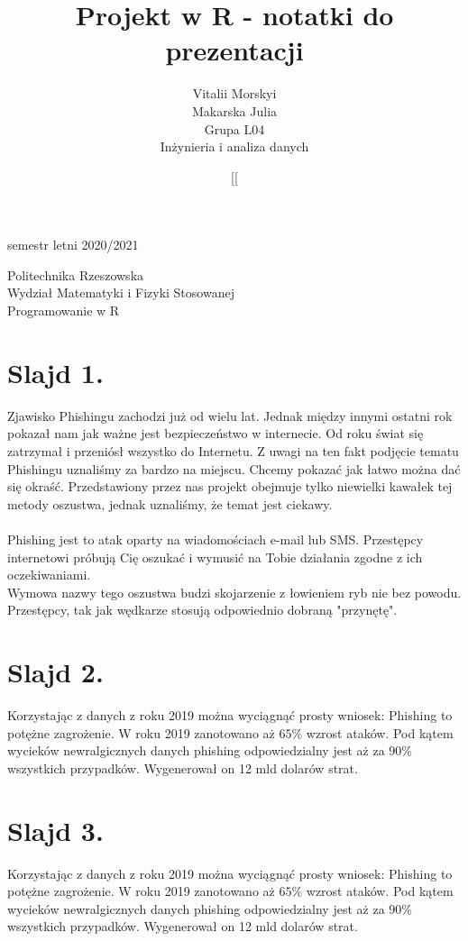 \documentclass{article}
\date[semestr letni 2020/2021
\author{Vitalii Morskyi\\Makarska Julia\\Grupa L04\\Inżynieria i analiza danych}
\title{Projekt w R - notatki do prezentacji}
\makeatletter
\renewcommand{\maketitle}{\begin{titlepage}
		\vspace{0.5cm}
		\vspace{\stretch{6}}
		\begin{flushright}
			\date[semestr letni 2020/2021
		\end{flushright}	
		\vspace*{2cm}
		\begin{center}
			Politechnika Rzeszowska\\
			Wydział Matematyki i Fizyki Stosowanej\\
			Programowanie w R
		\end{center}
		\vspace{3cm}
		\noindent
		\begin{center}
			\Large \@title
		\end{center}
		\vspace{13cm}
		\begin{flushright}
			\begin{minipage}{6.5cm}
				\begin{flushright}
					\normalsize \@author \par
				\end{flushright}
			\end{minipage}
		\end{flushright}
	\end{titlepage}
}
\makeatother
\begin{document}
	\maketitle	
	\tableofcontents %
	\newpage
	
\section{Slajd 1.}
{
	Zjawisko Phishingu zachodzi już od wielu lat. Jednak między innymi ostatni rok pokazał nam jak ważne jest bezpieczeństwo w internecie. Od roku świat się zatrzymał i przeniósł wszystko do Internetu. Z uwagi na ten fakt podjęcie tematu Phishingu uznaliśmy za bardzo na miejscu. Chcemy pokazać jak łatwo można dać się okraść. Przedstawiony przez nas projekt obejmuje tylko niewielki kawałek tej metody oszustwa, jednak uznaliśmy, że temat jest ciekawy.\\
	~\\
	Phishing jest to atak oparty na wiadomościach e-mail lub SMS. Przestępcy internetowi próbują Cię oszukać i wymusić na Tobie działania zgodne z ich oczekiwaniami.\\
	Wymowa nazwy tego oszustwa budzi skojarzenie z łowieniem ryb nie bez powodu. Przestępcy, tak jak wędkarze stosują odpowiednio dobraną "przynętę".
}
\section{Slajd 2.}
{
	Korzystając z danych z roku 2019 można wyciągnąć prosty wniosek: Phishing to potężne zagrożenie. W roku 2019 zanotowano aż $65\%$ wzrost ataków. Pod kątem wycieków newralgicznych danych phishing odpowiedzialny jest aż za $90\%$ wszystkich przypadków. Wygenerował on 12 mld dolarów strat.
}
\section{Slajd 3.}
{
	Korzystając z danych z roku 2019 można wyciągnąć prosty wniosek: Phishing to potężne zagrożenie. W roku 2019 zanotowano aż $65\%$ wzrost ataków. Pod kątem wycieków newralgicznych danych phishing odpowiedzialny jest aż za $90\%$ wszystkich przypadków. Wygenerował on 12 mld dolarów strat.
}
\end{document}
